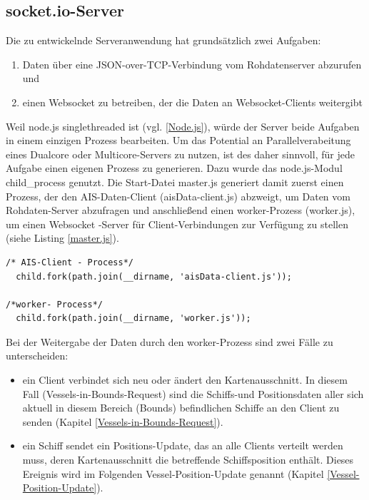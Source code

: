 \subsection{socket.io-Server}\label{socket.io-Server}
Die zu entwickelnde Serveranwendung hat grundsätzlich zwei Aufgaben: 
\begin{enumerate}
\item Daten über eine JSON-over-TCP-Verbindung vom Rohdatenserver abzurufen und
\item einen Websocket zu betreiben, der die Daten an Websocket-Clients weitergibt
\end{enumerate}
Weil node.js singlethreaded ist (vgl. \ref{Node.js}), würde der Server beide Aufgaben in einem einzigen Prozess bearbeiten. Um das Potential an Parallelverabeitung eines Dualcore oder Multicore-Servers zu nutzen, ist des daher sinnvoll, für jede Aufgabe einen eigenen Prozess zu generieren. Dazu wurde das node.js-Modul child\_process genutzt. Die Start-Datei master.js generiert damit zuerst einen Prozess, der den AIS-Daten-Client (aisData-client.js) abzweigt, um Daten vom Rohdaten-Server abzufragen und anschließend einen worker-Prozess (worker.js), um einen Websocket -Server für Client-Verbindungen zur Verfügung zu stellen (siehe Listing \ref{master.js}).
\begin{lstlisting}[caption=Generierung von Kindprozessen in master.js, firstnumber=16, label=master.js]
/* AIS-Client - Process*/
  child.fork(path.join(__dirname, 'aisData-client.js'));

/*worker- Process*/
  child.fork(path.join(__dirname, 'worker.js'));
\end{lstlisting}
Bei der Weitergabe der Daten durch den worker-Prozess sind zwei Fälle zu unterscheiden:
\begin{itemize}
\item ein Client verbindet sich neu oder ändert den Kartenausschnitt. In diesem Fall (Vessels-in-Bounds-Request) sind die Schiffs-und Positionsdaten aller sich aktuell in diesem Bereich (Bounds) befindlichen Schiffe an den Client zu senden (Kapitel \ref{Vessels-in-Bounds-Request}).
\item ein Schiff sendet ein Positions-Update, das an alle Clients verteilt werden muss, deren Kartenausschnitt die betreffende Schiffsposition enthält. Dieses Ereignis wird im Folgenden Vessel-Position-Update genannt (Kapitel \ref{Vessel-Position-Update}).
\end{itemize}

